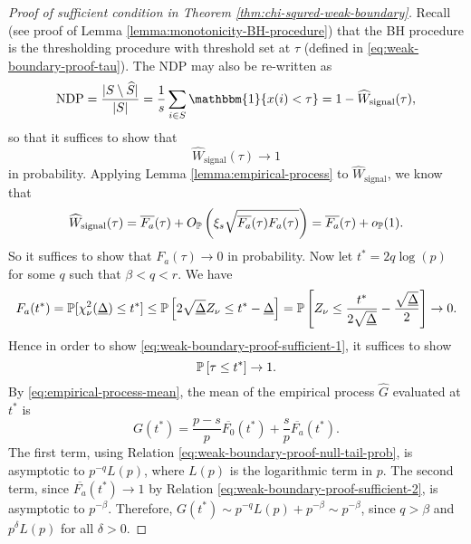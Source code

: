 \begin{proof}[Proof of sufficient condition in Theorem \ref{thm:chi-squred-weak-boundary}]
Recall (see proof of Lemma \ref{lemma:monotonicity-BH-procedure}) that the BH procedure is the thresholding procedure with threshold set at $\tau$ (defined in \eqref{eq:weak-boundary-proof-tau}).
The NDP may also be re-written as 
$$
\text{NDP} = \frac{|{S}\setminus\widehat{S}|}{|{S}|} = \frac{1}{s}\sum_{i\in S}\mathbbm{1}\{x(i) < \tau\} = 1 - \widehat{W}_\text{signal}(\tau),
$$
so that it suffices to show that 
\begin{equation} \label{eq:weak-boundary-proof-sufficient-1}
    \widehat{W}_\text{signal}(\tau)\to 1
\end{equation} in probability.
Applying Lemma \ref{lemma:empirical-process} to $\widehat{W}_\text{signal}$, we know that 
$$
\widehat{W}_\text{signal}(\tau) = \overline{F_a}(\tau) + O_\P\left(\xi_s\sqrt{\overline{F_a}(\tau)F_a(\tau)}\right) = \overline{F_a}(\tau) + o_\P(1).
$$
So it suffices to show that $F_a(\tau)\to 0$ in probability.
Now let $t^* = 2q\log(p)$ for some $q$ such that $\beta<q<r$.
We have 
\begin{equation} \label{eq:weak-boundary-proof-sufficient-2}
    F_a(t^*) = \P[\chi^2_\nu(\underline{\Delta}) \le t^*]
    \le \P\left[2\sqrt{\underline{\Delta}}Z_\nu \le t^* - \underline{\Delta}\right] 
    = \P\left[Z_\nu \le \frac{t^*}{2\sqrt{\underline{\Delta}}} - \frac{\sqrt{\underline{\Delta}}}{2}\right] \to 0.
\end{equation}
Hence in order to show \eqref{eq:weak-boundary-proof-sufficient-1}, it suffices to show 
\begin{equation} \label{eq:weak-boundary-proof-sufficient-3}
    \P\left[\tau \le t^*\right] \to 1.
\end{equation}
By \eqref{eq:empirical-process-mean}, the mean of the empirical process $\widehat{G}$ evaluated at $t^*$ is
\begin{equation*}
    G(t^*) = \frac{p-s}{p}\overline{F_0}(t^*) + \frac{s}{p}\overline{F_a}(t^*).
\end{equation*}
The first term, using Relation \eqref{eq:weak-boundary-proof-null-tail-prob}, is asymptotic to $p^{-q}L(p)$, where $L(p)$ is the logarithmic term in $p$.
The second term, since $\overline{F_a}(t^*)\to 1$ by Relation \eqref{eq:weak-boundary-proof-sufficient-2}, is asymptotic to $p^{-\beta}$.
Therefore, $G(t^*) \sim p^{-q}L(p) + p^{-\beta} \sim p^{-\beta}$, since $q>\beta$ and $p^\delta L(p)$ for all $\delta>0$.


\end{proof}
